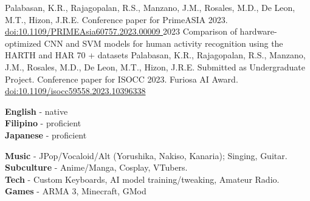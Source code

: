 \documentclass[9pt]{developercv}
\begin{document}
\begin{minipage}[t]{0.475\textwidth}
\begin{entrylist}
			{Palabasan, K.R., Rajagopalan, R.S., Manzano, J.M., Rosales, M.D., De Leon, M.T., Hizon, J.R.E.}
			{Conference paper for PrimeASIA 2023. \\
			\href{https://dx.doi.org/10.1109/PRIMEAsia60757.2023.00009}{doi:10.1109/PRIMEAsia60757.2023.00009 }}
		\entry
			{2023}
			{Comparison of hardware-optimized CNN and SVM models for human activity recognition using the HARTH and HAR 70 + datasets}
			{Palabasan, K.R., Rajagopalan, R.S., Manzano, J.M., Rosales, M.D., De Leon, M.T., Hizon, J.R.E.}
			{Submitted as Undergraduate Project. Conference paper for ISOCC 2023. Furiosa AI Award. \\ \href{https://dx.doi.org/10.1109/isocc59558.2023.10396338}{doi:10.1109/isocc59558.2023.10396338 }}
	\end{entrylist}
\end{minipage}

\vspace{0.5cm}

\begin{minipage}[t]{0.2\textwidth}
	\vspace{-\baselineskip}

	\textbf{English} - native\\
	\textbf{Filipino} - proficient\\
	\textbf{Japanese} - proficient\\
\end{minipage}
\hfill
\begin{minipage}[t]{0.6\textwidth}
	\vspace{-\baselineskip}
	
	\textbf{Music} - JPop/Vocaloid/Alt (Yorushika, Nakiso, Kanaria); Singing, Guitar.\\ \textbf{Subculture} - Anime/Manga, Cosplay, VTubers. \\
	\textbf{Tech} - Custom Keyboards, AI model training/tweaking, Amateur Radio. \\
	\textbf{Games} - ARMA 3, Minecraft, GMod
\end{minipage}
\end{document}
